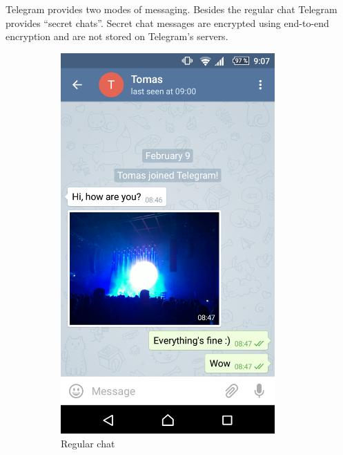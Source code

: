 \documentclass[thesis=M,english]{FITthesis}[2012/10/20]
\begin{document}
Telegram provides two modes of messaging. Besides the regular chat Telegram provides ``secret chats''. Secret chat messages are encrypted using end-to-end encryption and are not stored on Telegram's servers\cite{telegramfaq}.

\begin{figure}[htb]
	\centering
	\label{A}
	\begin{subfigure}[b]{0.4\textwidth}
		\centering
		\includegraphics[width=0.9\textwidth]{telegram-regular.png}
		\caption{Regular chat}
		\label{img:telegram:regular}
	\end{subfigure}
	\hfill
	\begin{subfigure}[b]{0.4\textwidth}
		\centering

\end{subfigure}
\end{figure}
\end{document}
